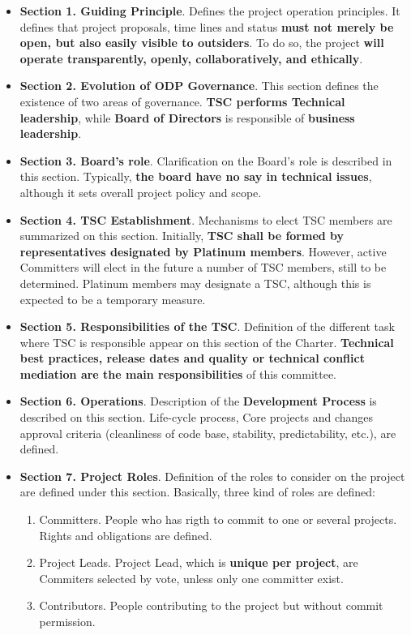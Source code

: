 \documentclass[a4paper, 12pt]{book}
\begin{document}
\begin{itemize}\itemsep0pt
\item{\textbf{Section 1. Guiding Principle}}. Defines the project operation principles. It defines that project proposals, time lines and status \textbf{must not merely be open, but also easily visible to outsiders}. To do so, the project \textbf{will operate transparently, openly, collaboratively, and ethically}.
\item{\textbf{Section 2. Evolution of ODP Governance}}. This section defines the existence of two areas of governance. \textbf{TSC performs Technical leadership}, while \textbf{Board of Directors} is responsible of \textbf{business leadership}.
\item{\textbf{Section 3. Board's role}}. Clarification on the Board's role is described in this section. Typically, \textbf{the board have no say in technical issues}, although it sets overall project policy and scope.
\item{\textbf{Section 4. TSC Establishment}}. Mechanisms to elect TSC members are summarized on this section. Initially, \textbf{TSC shall be formed by representatives designated by Platinum members}. However, active Committers will elect in the future a number of TSC members, still to be determined. Platinum members may designate a TSC, although this is expected to be a temporary measure.
\item{\textbf{Section 5. Responsibilities of the TSC}}. Definition of the different task where TSC is responsible appear on this section of the Charter. \textbf{Technical best practices, release dates and quality or technical conflict mediation are the main responsibilities} of this committee.
\item{\textbf{Section 6. Operations}}. Description of the \textbf{Development Process} is described on this section. Life-cycle process, Core projects and changes approval criteria (cleanliness of code base, stability, predictability, etc.), are defined.
\item{\textbf{Section 7. Project Roles}}. Definition of the roles to consider on the project are defined under this section. Basically, three kind of roles are defined:
\begin{enumerate}\itemsep0pt
\item{Committers}. People who has rigth to commit to one or several projects. Rights and obligations are defined.
\item{Project Leads}. Project Lead, which is \textbf{unique per project}, are Commiters selected by vote, unless only one committer exist.
\item{Contributors}. People contributing to the project but without commit permission.
\end{enumerate}
\end{itemize}
\end{document}
